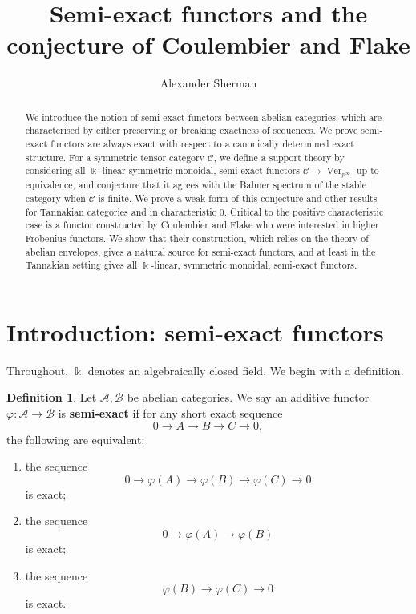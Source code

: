 \documentclass[11pt]{amsart}
\def\Cs{\mathcal{C}}
\def\As{\mathscr{A}}
\def\Bs{\mathscr{B}}
\def\Cs{\mathscr{C}}
\def\Ver{\operatorname{Ver}}
\theoremstyle{definition}
\newtheorem{definition}[thm]{Definition}
\theoremstyle{remark}
\numberwithin{equation}{section}
\begin{document}
    
    
    \title{Semi-exact functors and the conjecture of Coulembier and Flake}

    \author{Alexander Sherman}
    
    \begin{abstract}
        We introduce the notion of semi-exact functors between abelian categories, which are characterised by either preserving or breaking exactness of sequences.  We prove semi-exact functors are always exact with respect to a canonically determined exact structure. For a symmetric tensor category $\Cs$, we define a support theory by considering all $\Bbbk$-linear symmetric monoidal, semi-exact functors $\Cs\to\Ver_{p^\infty}$ up to equivalence, and conjecture that it agrees with the Balmer spectrum of the stable category when $\Cs$ is finite.  We prove a weak form of this conjecture and other results for Tannakian categories and in characteristic 0.  Critical to the positive characteristic case is a functor constructed by Coulembier and Flake who were interested in higher Frobenius functors.  We show that their construction, which relies on the theory of abelian envelopes, gives a natural source for semi-exact functors, and at least in the Tannakian setting gives all $\Bbbk$-linear, symmetric monoidal, semi-exact functors.
    \end{abstract}


\maketitle

\section{Introduction: semi-exact functors}

Throughout, $\Bbbk$ denotes an algebraically closed field.  We begin with a definition.

\begin{definition}
    Let $\As,\Bs$ be abelian categories.  We say an additive functor $\varphi:\As\to\Bs$ is \textbf{semi-exact} if for any short exact sequence
    \[
    0\to A\to B\to C\to 0,
    \]
    the following are equivalent:
    \begin{enumerate}
        \item the sequence
    \[
    0\to \varphi(A)\to\varphi(B)\to\varphi(C)\to0
    \]
    is exact;
    \item the sequence
    \[
    0\to \varphi(A)\to\varphi(B)
    \]
    is exact;
    \item the sequence 
    \[
    \varphi(B)\to\varphi(C)\to0
    \]
    is exact.
    \end{enumerate}
\end{definition}
\end{document}
